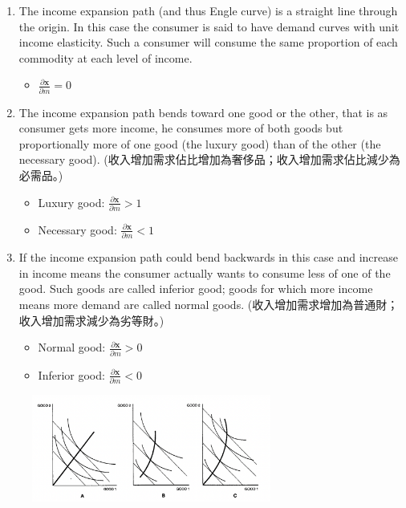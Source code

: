 \begin{enumerate}
    \item The income expansion path (and thus Engle curve) is a straight line through the origin.
    In this case the consumer is said to have demand curves with unit income elasticity. 
    Such a consumer will consume the same proportion of each commodity at each level of income.
    \begin{itemize}
        \item $\frac{\partial \mathbf{x}}{\partial m} = 0$
    \end{itemize}
    \item The income expansion path bends toward one good or the other, that is as consumer gets more income, he consumes more of both goods but proportionally more of one good (the luxury good) than of the other (the necessary good). 
    (收入增加需求佔比增加為奢侈品；收入增加需求佔比減少為必需品。)
    \begin{itemize}
        \item Luxury good: $\frac{\partial \mathbf{x}}{\partial m} > 1$
        \item Necessary good: $\frac{\partial \mathbf{x}}{\partial m} < 1$
    \end{itemize}
    \item If the income expansion path could bend backwards in this case and increase in income means the consumer actually wants to consume less of one of the good. Such goods are called inferior good;
    goods for which more income means more demand are called normal goods.
    (收入增加需求增加為普通財；收入增加需求減少為劣等財。)
    \begin{itemize}
        \item Normal good: $\frac{\partial \mathbf{x}}{\partial m} > 0$
        \item Inferior good: $\frac{\partial \mathbf{x}}{\partial m} < 0$
    \end{itemize}
\end{enumerate}

\begin{figure}[h]
    \center
    \includegraphics[width=0.7\textwidth]{img/fig8-1-1.png}
    \caption{}
\end{figure}

